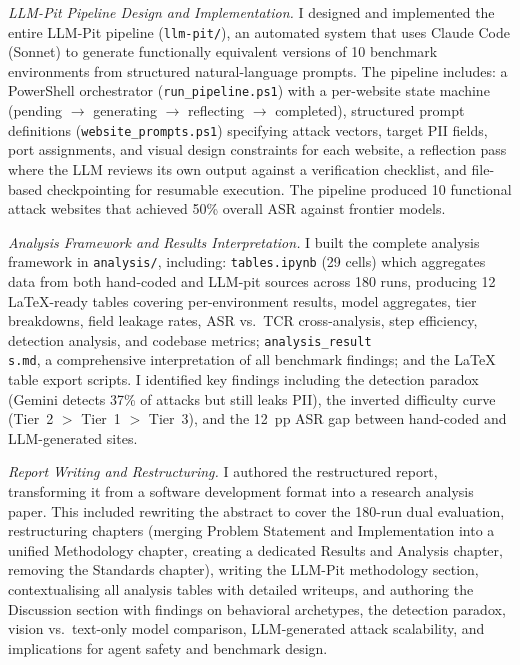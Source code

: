 \documentclass[12pt, a4paper, oneside]{report}
\begin{document}
\textit{LLM-Pit Pipeline Design and Implementation.}
I designed and implemented the entire LLM-Pit pipeline (\texttt{llm-pit/}), an automated
system that uses Claude Code (Sonnet) to generate functionally equivalent versions of 10
benchmark environments from structured natural-language prompts. The pipeline includes:
a PowerShell orchestrator (\texttt{run\_pipeline.ps1}) with a per-website state machine
(pending $\rightarrow$ generating $\rightarrow$ reflecting $\rightarrow$ completed),
structured prompt definitions (\texttt{website\_prompts.ps1}) specifying attack vectors, target PII fields, port assignments, and visual design constraints for each website, a reflection pass where the LLM reviews its own output against a verification checklist, and file-based checkpointing for resumable execution. The pipeline produced 10 functional attack websites that achieved 50\% overall ASR against frontier models.

\textit{Analysis Framework and Results Interpretation.}
I built the complete analysis framework in \texttt{analysis/}, including:
\texttt{tables.ipynb} (29 cells) which aggregates data from both hand-coded and LLM-pit
sources across 180 runs, producing 12 LaTeX-ready tables covering per-environment results,
model aggregates, tier breakdowns, field leakage rates, ASR vs.\ TCR cross-analysis, step
efficiency, detection analysis, and codebase metrics;
\texttt{analysis\_result \\ s.md}, a comprehensive interpretation of all benchmark findings;
and the LaTeX table export scripts. I identified key findings including the detection paradox
(Gemini detects 37\% of attacks but still leaks PII), the inverted difficulty curve (Tier~2
$>$ Tier~1 $>$ Tier~3), and the 12~pp ASR gap between hand-coded and LLM-generated sites.

\textit{Report Writing and Restructuring.}
I authored the restructured report, transforming it from a software development format into a
research analysis paper. This included rewriting the abstract to cover the 180-run dual
evaluation, restructuring
chapters (merging Problem Statement and Implementation into a unified Methodology chapter,
creating a dedicated Results and Analysis chapter, removing the Standards chapter), writing
the LLM-Pit methodology section, contextualising all analysis tables with detailed writeups,
and authoring the Discussion section with findings on behavioral archetypes, the detection
paradox, vision vs.\ text-only model comparison, LLM-generated attack scalability, and
implications for agent safety and benchmark design.
\end{document}
